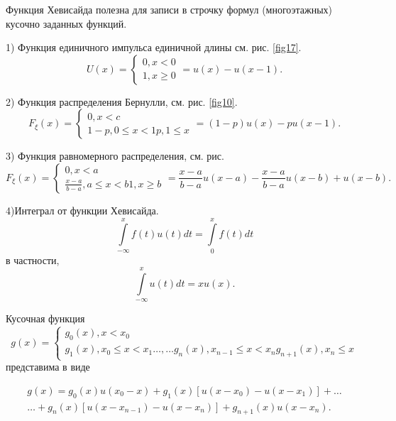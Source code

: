 \begin{example}
	Функция Хевисайда полезна для записи в строчку формул (многоэтажных) кусочно заданных функций.

1) Функция единичного импульса единичной длины см. рис. \ref{fig17}.
\begin{equation*}
U(x) = 
 \begin{cases}
   0,x<0\\
   1,x\geqslant 0 
 \end{cases}
 =u(x)-u(x-1).
\end{equation*}


2) Функция распределения Бернулли, см. рис. \ref{fig10}.
\begin{equation*}
F_{\xi}(x) = 
 \begin{cases}
   0,x<c\\
   1-p,0\leqslant x<1
   p,1\leqslant x
 \end{cases}
 =(1-p)u(x)-pu(x-1).
\end{equation*}

3) Функция равномерного распределения, см. рис. %
\begin{equation*}
F_{\xi}(x) = 
 \begin{cases}
   0,x<a\\
   \frac{x-a}{b-a},a\leqslant x<b
   1,x\geqslant b
 \end{cases}
 =
 \frac{x-a}{b-a}u(x-a)-\frac{x-a}{b-a}u(x-b)+u(x-b).
\end{equation*}

4)Интеграл от функции Хевисайда.
\begin{equation*}
	\int\limits_{-\infty}^x f(t)u(t)dt=\int\limits_0^xf(t)dt
\end{equation*}
в частности,
\begin{equation*}
	\int\limits_{-\infty}^x u(t)dt=xu(x).
\end{equation*}

\end{example}

\begin{lemma}
	Кусочная функция
\begin{equation*}
	g(x)=
	\begin{cases}
		g_0(x),x<x_0 \\
		g_1(x), x_0\leqslant x<x_1
		\ldots,\ldots
		g_n(x),x_{n-1}\leqslant x<x_n
		g_{n+1}(x), x_n\leqslant x
 	\end{cases}
\end{equation*}
	представима в виде

\begin{gather*}
g(x)=g_0(x)u(x_0-x)+g_1(x)[u(x-x_0)-u(x-x_1)]+\ldots \\
\ldots+g_n(x)[u(x-x_{n-1})-u(x-x_n)]+g_{n+1}(x)u(x-x_n).
\end{gather*}
\end{lemma}

